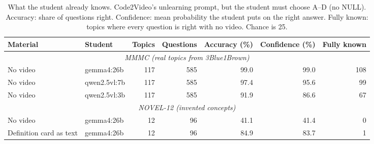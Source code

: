 \begin{table}[!tbp]\centering\small
\caption{What the student already knows. Code2Video's unlearning prompt, but the student must choose A--D (no NULL). Accuracy: share of questions right. Confidence: mean probability the student puts on the right answer. Fully known: topics where every question is right with no video. Chance is 25.}\label{tab:priors}
\begin{adjustbox}{max width=\linewidth}\begin{tabular}{llrrrrr}\toprule Material & Student & Topics & Questions & Accuracy (\%) & Confidence (\%) & Fully known\\
\midrule
\multicolumn{7}{c}{\textit{MMMC (real topics from 3Blue1Brown)}}\\
No video & gemma4:26b & 117 & 585 & 99.0 & 99.0 & 108 \\
No video & qwen2.5vl:7b & 117 & 585 & 97.4 & 95.6 & 99 \\
No video & qwen2.5vl:3b & 117 & 585 & 91.9 & 86.6 & 67 \\
\midrule
\multicolumn{7}{c}{\textit{NOVEL-12 (invented concepts)}}\\
No video & gemma4:26b & 12 & 96 & 41.1 & 41.4 & 0 \\
Definition card as text & gemma4:26b & 12 & 96 & 84.9 & 83.7 & 1 \\
\bottomrule\end{tabular}\end{adjustbox}
\end{table}
